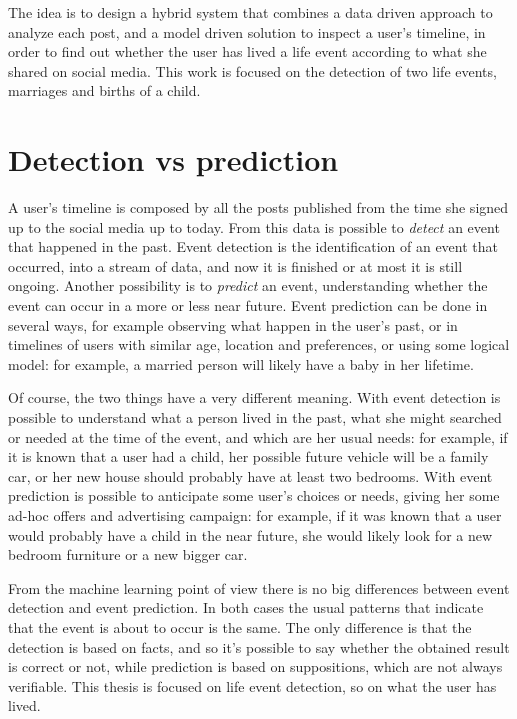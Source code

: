 The idea is to design a hybrid system that combines a data driven approach to analyze each post, and a model driven solution to inspect a user's timeline, in order to find out whether the user has lived a life event according to what she shared on social media. This work is focused on the detection of two life events, marriages and births of a child.

\section{Detection vs prediction}

A user's timeline is composed by all the posts published from the time she signed up to the social media up to today. From this data is possible to \emph{detect} an event that happened in the past. Event detection is the identification of an event that occurred, into a stream of data, and now it is finished or at most it is still ongoing. Another possibility is to \emph{predict} an event, understanding whether the event can occur in a more or less near future. Event prediction can be done in several ways, for example observing what happen in the user's past, or in timelines of users with similar age, location and preferences, or using some logical model: for example, a married person will likely have a baby in her lifetime.

Of course, the two things have a very different meaning. With event detection is possible to understand what a person lived in the past, what she might searched or needed at the time of the event, and which are her usual needs: for example, if it is known that a user had a child, her possible future vehicle will be a family car, or her new house should probably have at least two bedrooms. With event prediction is possible to anticipate some user's choices or needs, giving her some ad-hoc offers and advertising campaign: for example, if it was known that a user would probably have a child in the near future, she would likely look for a new bedroom furniture or a new bigger car.

From the machine learning point of view there is no big differences between event detection and event prediction. In both cases the usual patterns that indicate that the event is about to occur is the same. The only difference is that the detection is based on facts, and so it's possible to say whether the obtained result is correct or not, while prediction is based on suppositions, which are not always verifiable. This thesis is focused on life event detection, so on what the user has lived.

